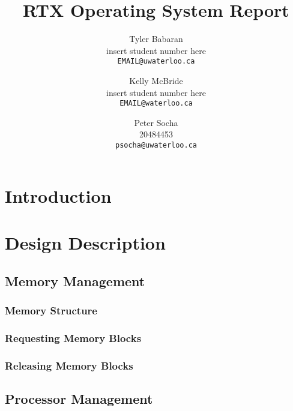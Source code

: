 \documentclass[12pt]{report}
\begin{document}
\title{RTX Operating System Report}

\author{
    Tyler Babaran\\
		insert student number here\\
    \texttt{EMAIL@uwaterloo.ca}
    \and
    Kelly McBride\\
		insert student number here\\
    \texttt{EMAIL@waterloo.ca}
    \and
    Peter Socha\\
		20484453\\
    \texttt{psocha@uwaterloo.ca}
}

\maketitle


\tableofcontents
\listofalgorithms
\listoffigures

\chapter{Introduction}

\chapter{Design Description}

\section{Memory Management}

\subsection{Memory Structure}

\subsection{Requesting Memory Blocks}

\subsection{Releasing Memory Blocks}




\section{Processor Management}
\end{document}
